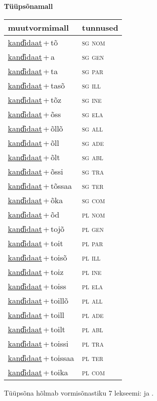 
\vspace{1.8em}
\begin{minipage}{\textwidth}
\textbf{Tüüpsõnamall \,}\\

\begin{sideways}
\begin{tabular}{l l}
muutvormimall & tunnused \\
\hline
\underline{kand̕idaat}\,+\,tõ & \textsc{ sg nom } \\
\underline{kand̕idaat}\,+\,a & \textsc{ sg gen } \\
\underline{kand̕idaat}\,+\,ta & \textsc{ sg par } \\
\underline{kand̕idaat}\,+\,tasõ & \textsc{ sg ill } \\
\underline{kand̕idaat}\,+\,tõz & \textsc{ sg ine } \\
\underline{kand̕idaat}\,+\,õss & \textsc{ sg ela } \\
\underline{kand̕idaat}\,+\,õllõ & \textsc{ sg all } \\
\underline{kand̕idaat}\,+\,õll & \textsc{ sg ade } \\
\underline{kand̕idaat}\,+\,õlt & \textsc{ sg abl } \\
\underline{kand̕idaat}\,+\,õssi & \textsc{ sg tra } \\
\underline{kand̕idaat}\,+\,tõssaa & \textsc{ sg ter } \\
\underline{kand̕idaat}\,+\,õka & \textsc{ sg com } \\
\underline{kand̕idaat}\,+\,õd & \textsc{ pl nom } \\
\underline{kand̕idaat}\,+\,tojõ & \textsc{ pl gen } \\
\underline{kand̕idaat}\,+\,toit & \textsc{ pl par } \\
\underline{kand̕idaat}\,+\,toisõ & \textsc{ pl ill } \\
\underline{kand̕idaat}\,+\,toiz & \textsc{ pl ine } \\
\underline{kand̕idaat}\,+\,toiss & \textsc{ pl ela } \\
\underline{kand̕idaat}\,+\,toillõ & \textsc{ pl all } \\
\underline{kand̕idaat}\,+\,toill & \textsc{ pl ade } \\
\underline{kand̕idaat}\,+\,toilt & \textsc{ pl abl } \\
\underline{kand̕idaat}\,+\,toissi & \textsc{ pl tra } \\
\underline{kand̕idaat}\,+\,toissaa & \textsc{ pl ter } \\
\underline{kand̕idaat}\,+\,toika & \textsc{ pl com } \\
\end{tabular}
\end{sideways}
\label{tab:tüüpsõnamall-kand̕idaattõ}

\end{minipage}

 
\vspace{1em}
\noindent Tüüpsõna hõlmab vormisõnastiku 7 lekseemi:  ja .

